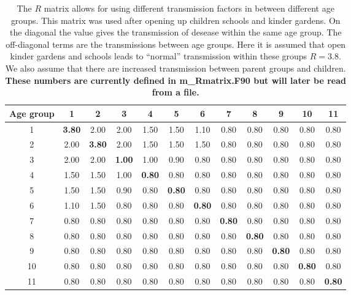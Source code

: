 \documentclass[twoside,11pt]{article}
\begin{document}
\begin{table}[htb]
\begin{center}
\tabcolsep=3.5pt
\begin{tabular}{c|ccccccccccc}
\hline
 Age group & 1      & 2      & 3      & 4      & 5      & 6      & 7      & 8      & 9      & 10     & 11      \\
\hline
    1      & \bf 3.80   & 2.00   &   2.00 &     1.50 &     1.50  &    1.10  &    0.80  &    0.80  &    0.80  &    0.80 &     0.80  \\
    2      & 2.00   & \bf 3.80   &   2.00 &     1.50 &     1.50  &    1.50  &    0.80  &    0.80  &    0.80  &    0.80 &     0.80  \\
    3      & 2.00   & 2.00   &  \bf  1.00 &     1.00 &     0.90  &    0.80  &    0.80  &    0.80  &    0.80  &    0.80 &     0.80  \\
    4      & 1.50   & 1.50   &   1.00 &   \bf   0.80 &     0.80  &    0.80  &    0.80  &    0.80  &    0.80  &    0.80 &     0.80  \\
    5      & 1.50   & 1.50   &   0.90 &     0.80 &  \bf    0.80  &    0.80  &    0.80  &    0.80  &    0.80  &    0.80 &     0.80  \\
    6      & 1.10   & 1.50   &   0.80 &     0.80 &     0.80  &  \bf   0.80  &    0.80  &    0.80  &    0.80  &    0.80 &     0.80  \\
    7      & 0.80   & 0.80   &   0.80 &     0.80 &     0.80  &    0.80  &  \bf   0.80  &    0.80  &    0.80  &    0.80 &     0.80  \\
    8      & 0.80   & 0.80   &   0.80 &     0.80 &     0.80  &    0.80  &    0.80  & \bf    0.80  &    0.80  &    0.80 &     0.80  \\
    9      & 0.80   & 0.80   &   0.80 &     0.80 &     0.80  &    0.80  &    0.80  &    0.80  &  \bf   0.80  &    0.80 &     0.80  \\
    10     & 0.80   & 0.80   &   0.80 &     0.80 &     0.80  &    0.80  &    0.80  &    0.80  &    0.80  & \bf    0.80 &     0.80  \\
    11     & 0.80   & 0.80   &   0.80 &     0.80 &     0.80  &    0.80  &    0.80  &    0.80  &    0.80  &    0.80 &  \bf    0.80  \\
\hline
\end{tabular}
\end{center}
\caption{The $R$ matrix allows for using different transmission factors in between different age groups.
This matrix was used after opening up children schools and kinder gardens. On the diagonal the value gives the 
transmission of desease within the same age group. The off-diagonal terms are the transmissions between age groups.
Here it is assumed that open kinder gardens and schools leads to ``normal'' transmission within these groups $R=3.8$.
We also assume that there are increased transmission between parent groups and children.
\textbf{These numbers are currently defined in m\_Rmatrix.F90 but will later be read from a file.}
\label{tab:R}}
\end{table}
%
\end{document}
